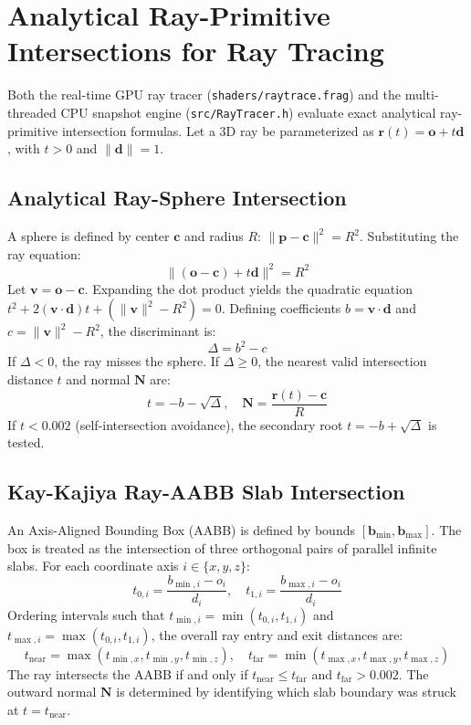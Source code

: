 \section{Analytical Ray-Primitive Intersections for Ray Tracing}
Both the real-time GPU ray tracer (\texttt{shaders/raytrace.frag}) and the multi-threaded CPU snapshot engine (\texttt{src/RayTracer.h}) evaluate exact analytical ray-primitive intersection formulas. Let a 3D ray be parameterized as $\mathbf{r}(t) = \mathbf{o} + t \mathbf{d}$, with $t > 0$ and $\|\mathbf{d}\| = 1$.

\subsection{Analytical Ray-Sphere Intersection}
A sphere is defined by center $\mathbf{c}$ and radius $R$: $\|\mathbf{p} - \mathbf{c}\|^2 = R^2$. Substituting the ray equation:
\begin{equation}
\|(\mathbf{o} - \mathbf{c}) + t \mathbf{d}\|^2 = R^2
\end{equation}
Let $\mathbf{v} = \mathbf{o} - \mathbf{c}$. Expanding the dot product yields the quadratic equation $t^2 + 2(\mathbf{v}\cdot\mathbf{d})t + (\|\mathbf{v}\|^2 - R^2) = 0$.
Defining coefficients $b = \mathbf{v}\cdot\mathbf{d}$ and $c = \|\mathbf{v}\|^2 - R^2$, the discriminant is:
\begin{equation}
\Delta = b^2 - c
\end{equation}
If $\Delta < 0$, the ray misses the sphere. If $\Delta \ge 0$, the nearest valid intersection distance $t$ and normal $\mathbf{N}$ are:
\begin{equation}
t = -b - \sqrt{\Delta}, \quad \mathbf{N} = \frac{\mathbf{r}(t) - \mathbf{c}}{R}
\label{eq:ray_sphere}
\end{equation}
If $t < 0.002$ (self-intersection avoidance), the secondary root $t = -b + \sqrt{\Delta}$ is tested.

\subsection{Kay-Kajiya Ray-AABB Slab Intersection}
An Axis-Aligned Bounding Box (AABB) is defined by bounds $[\mathbf{b}_{\min}, \mathbf{b}_{\max}]$. The box is treated as the intersection of three orthogonal pairs of parallel infinite slabs. For each coordinate axis $i \in \{x, y, z\}$:
\begin{equation}
t_{0, i} = \frac{b_{\min, i} - o_i}{d_i}, \quad t_{1, i} = \frac{b_{\max, i} - o_i}{d_i}
\end{equation}
Ordering intervals such that $t_{\min, i} = \min(t_{0, i}, t_{1, i})$ and $t_{\max, i} = \max(t_{0, i}, t_{1, i})$, the overall ray entry and exit distances are:
\begin{equation}
t_{\text{near}} = \max\left( t_{\min, x}, t_{\min, y}, t_{\min, z} \right), \quad
t_{\text{far}} = \min\left( t_{\max, x}, t_{\max, y}, t_{\max, z} \right)
\label{eq:slab_method}
\end{equation}
The ray intersects the AABB if and only if $t_{\text{near}} \le t_{\text{far}}$ and $t_{\text{far}} > 0.002$. The outward normal $\mathbf{N}$ is determined by identifying which slab boundary was struck at $t = t_{\text{near}}$.

